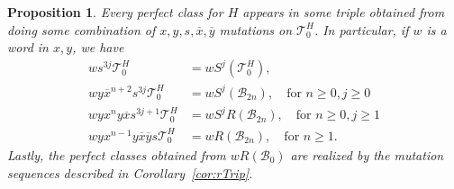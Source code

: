 \documentclass[11pt, reqno]{amsart}
\newtheorem{prop}[thm]{Proposition}
\theoremstyle{remark}
\numberwithin{equation}{subsection}
\numberwithin{figure}{section}
\theoremstyle{customremark}
\newcommand{\Tt}{\mathcal{T}}
\newcommand{\ov}{\overline}
\begin{document}
\begin{prop}
    \label{lem:perf4H}
    Every perfect class for $H$ appears in some triple obtained from doing some combination of 
    $x,y,s,\ov{x},\ov{y}$ mutations on 
    $\Tt_{0}^H$. In particular, if $w$ is a word in $x,y$, we have
     \begin{align*}
        ws^{3j}\Tt_{0}^H&=wS^j(\Tt_{0}^H),\\
    wy\ov{x}^{n+2}s^{3j}\Tt_{0}^H&=wS^j(\mathcal{B}_{2n}), \quad \text{for $n \geq 0, j \geq 0$} \\
        wyx^ny\ov{x}s^{3j+1}\Tt_{0}^H&= wS^jR(\mathcal{B}_{2n}), \quad \text{for $n \geq 0, j \geq 1$}\\
         wyx^{n-1}y\ov{x}\ov{y}s\Tt_{0}^H&=wR(\mathcal{B}_{2n}), \quad \text{for $n \geq 1$}. 
    \end{align*}
    Lastly, the perfect classes obtained from \(wR(\mathcal B_0)\) are realized by the mutation sequences described in Corollary~\ref{cor:rTrip}.
\end{prop}
\end{document}
